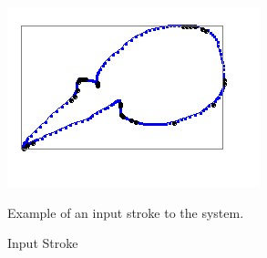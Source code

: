\documentclass[preprint,10pt,5p,twocolumn]{elsarticle}
\begin{document}
 \begin{figure}[h]
	\centering
		\includegraphics[scale=0.5]{images/stroke3.jpg}
	\caption{Input Stroke} Example of an input stroke to the system. 
	\label{fig:orignalStroke}
\end{figure}

 \begin{figure}
	\centering
			\hfill

\end{figure}
\end{document}

